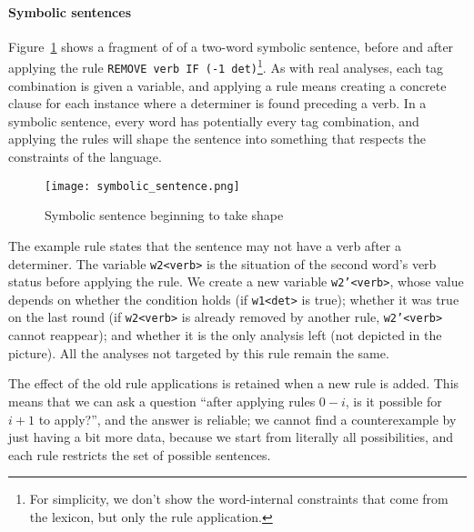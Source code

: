 
\paragraph{Symbolic sentences}

Figure~\ref{fig:example} shows a fragment of of a two-word symbolic sentence, before and after applying the rule \texttt{REMOVE verb IF (-1 det)}\footnote{For simplicity, we don't show the word-internal constraints that come from the lexicon, but only the rule application.}.
As with real analyses, each tag combination is given a variable, and applying a rule means creating a concrete clause for each instance where a determiner is found preceding a verb.
In a symbolic sentence, every word has potentially every tag combination, and applying the rules will shape the sentence into something that respects the constraints of the language.

\begin{figure}[h]
\texttt{[image: symbolic\_sentence.png]}
\caption{Symbolic sentence beginning to take shape }
\label{fig:example}
\end{figure}


The example rule states that the sentence may not have a verb after a determiner.
The variable \texttt{w2<verb>} is the situation of the second word's verb status before applying the rule. We create a new variable \texttt{w2'<verb>}, whose value depends on whether the condition holds (if \texttt{w1<det>} is true); whether it was true on the last round (if \texttt{w2<verb>} is already removed by another rule, \texttt{w2'<verb>} cannot reappear); and whether it is the only analysis left (not depicted in the picture).
All the analyses not targeted by this rule remain the same.




The effect of the old rule applications is retained when a new rule is added.
This means that we can ask a question ``after applying rules $0-i$, is it possible for $i+1$ to apply?'', and the answer is reliable; we cannot find a counterexample by just having a bit more data, because we start from literally all possibilities, and each rule restricts the set of possible sentences.

